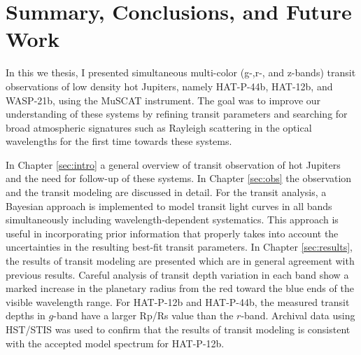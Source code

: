\chapter{Summary, Conclusions, and Future Work \label{sec:summary}}
In this we thesis, I presented simultaneous multi-color (g-,r-, and z-bands) transit observations of low density hot Jupiters, namely HAT-P-44b, HAT-12b, and WASP-21b, using the MuSCAT instrument. %
The goal was to improve our understanding of these systems by refining transit parameters and searching for broad atmospheric signatures such as Rayleigh scattering in the optical wavelengths for the first time towards these systems. 

In Chapter \ref{sec:intro} a general overview of transit observation of hot Jupiters and the need for follow-up of these systems. In Chapter \ref{sec:obs} the observation and the transit modeling are discussed in detail. For the transit analysis, a Bayesian approach is implemented to model transit light curves in all bands simultaneously including wavelength-dependent systematics. This approach is useful in incorporating prior information that properly takes into account the uncertainties in the resulting best-fit transit parameters.
In Chapter \ref{sec:results}, the results of transit modeling are presented which are in general agreement with previous results. %
Careful analysis of transit depth variation in each band show a marked increase in the planetary radius from the red toward the blue ends of the visible wavelength range. For HAT-P-12b and HAT-P-44b, the measured transit depths in $g$-band have a larger Rp/Rs value than the $r$-band. Archival data using HST/STIS was used to confirm that the results of transit modeling is consistent with the accepted model spectrum for HAT-P-12b.

